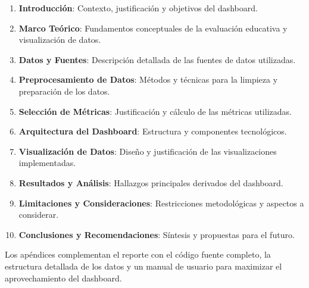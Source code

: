 \begin{enumerate}
    \item \textbf{Introducción}: Contexto, justificación y objetivos del dashboard.
    \item \textbf{Marco Teórico}: Fundamentos conceptuales de la evaluación educativa y visualización de datos.
    \item \textbf{Datos y Fuentes}: Descripción detallada de las fuentes de datos utilizadas.
    \item \textbf{Preprocesamiento de Datos}: Métodos y técnicas para la limpieza y preparación de los datos.
    \item \textbf{Selección de Métricas}: Justificación y cálculo de las métricas utilizadas.
    \item \textbf{Arquitectura del Dashboard}: Estructura y componentes tecnológicos.
    \item \textbf{Visualización de Datos}: Diseño y justificación de las visualizaciones implementadas.
    \item \textbf{Resultados y Análisis}: Hallazgos principales derivados del dashboard.
    \item \textbf{Limitaciones y Consideraciones}: Restricciones metodológicas y aspectos a considerar.
    \item \textbf{Conclusiones y Recomendaciones}: Síntesis y propuestas para el futuro.
\end{enumerate}

Los apéndices complementan el reporte con el código fuente completo, la estructura detallada de los datos y un manual de usuario para maximizar el aprovechamiento del dashboard.
